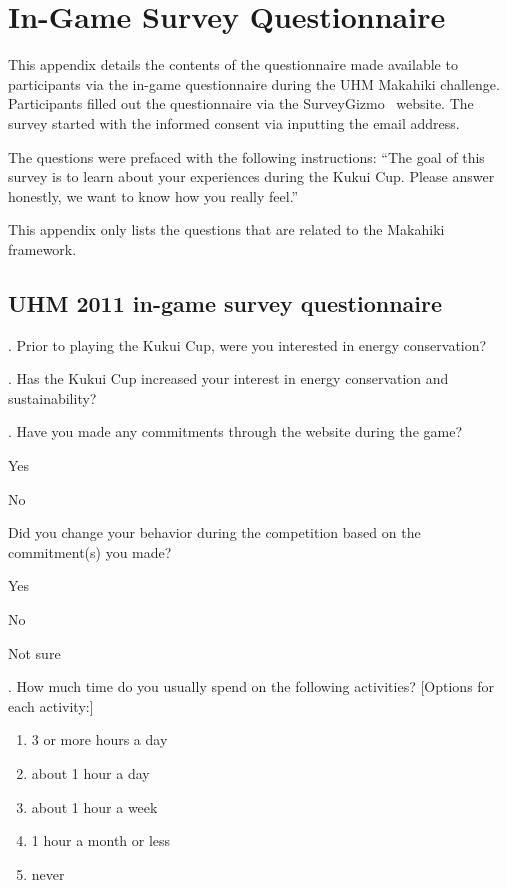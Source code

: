 \chapter{In-Game Survey Questionnaire}
\label{app:in-game-questionnaire}

This appendix details the contents of the questionnaire made available to participants via the in-game questionnaire during the UHM Makahiki challenge. Participants filled out the questionnaire via the SurveyGizmo~\cite{surveygizmo} website. The survey started with the informed consent via inputting  the email address. 

The questions were prefaced with the following instructions: ``The goal of this survey is to learn about your experiences during the Kukui Cup. Please answer honestly, we want to know how you really feel.''

This appendix only lists the questions that are related to the Makahiki framework.

\section {UHM 2011 in-game survey questionnaire}
. Prior to playing the Kukui Cup, were you interested in energy conservation?

. Has the Kukui Cup increased your interest in energy conservation and sustainability?

. Have you made any commitments through the website during the game?
\begin{radiobutton}
	\item Yes
	\item No
\end{radiobutton}

\noindent
[If Yes] Did you change your behavior during the competition based on the commitment(s) you made?
\begin{radiobutton}
	\item Yes
	\item No
	\item Not sure
\end{radiobutton}

. How much time do you usually spend on the following activities?
[Options for each activity:]
\begin{enumerate}
	\item 3 or more hours a day
	\item about 1 hour a day
	\item about 1 hour a week
	\item 1 hour a month or less
	\item never
\end{enumerate}

